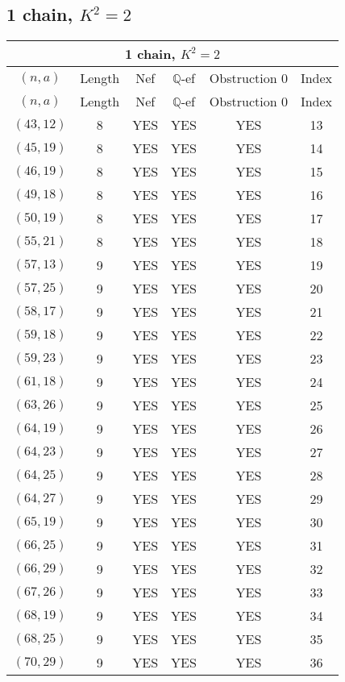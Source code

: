\subsection{1 chain, $K^2 = 2$}
\begin{longtable}{|c|c|c|c|c|c|}
\hline
\multicolumn{6}{|c|}{1 chain, $K^2 = 2$}\\
\hline
$(n,a)$ & Length & Nef & $\mathbb Q$-ef & Obstruction 0 & Index\\
\hline
\endfirsthead

\hline
$(n,a)$ & Length & Nef & $\mathbb Q$-ef & Obstruction 0 & Index\\
\hline
\endhead
\hline
\endfoot

$(43, 12)$ & 8 & YES & YES & YES & 13\\
$(45, 19)$ & 8 & YES & YES & YES & 14\\
$(46, 19)$ & 8 & YES & YES & YES & 15\\
$(49, 18)$ & 8 & YES & YES & YES & 16\\
$(50, 19)$ & 8 & YES & YES & YES & 17\\
$(55, 21)$ & 8 & YES & YES & YES & 18\\
$(57, 13)$ & 9 & YES & YES & YES & 19\\
$(57, 25)$ & 9 & YES & YES & YES & 20\\
$(58, 17)$ & 9 & YES & YES & YES & 21\\
$(59, 18)$ & 9 & YES & YES & YES & 22\\
$(59, 23)$ & 9 & YES & YES & YES & 23\\
$(61, 18)$ & 9 & YES & YES & YES & 24\\
$(63, 26)$ & 9 & YES & YES & YES & 25\\
$(64, 19)$ & 9 & YES & YES & YES & 26\\
$(64, 23)$ & 9 & YES & YES & YES & 27\\
$(64, 25)$ & 9 & YES & YES & YES & 28\\
$(64, 27)$ & 9 & YES & YES & YES & 29\\
$(65, 19)$ & 9 & YES & YES & YES & 30\\
$(66, 25)$ & 9 & YES & YES & YES & 31\\
$(66, 29)$ & 9 & YES & YES & YES & 32\\
$(67, 26)$ & 9 & YES & YES & YES & 33\\
$(68, 19)$ & 9 & YES & YES & YES & 34\\
$(68, 25)$ & 9 & YES & YES & YES & 35\\
$(70, 29)$ & 9 & YES & YES & YES & 36\\

\end{longtable}

